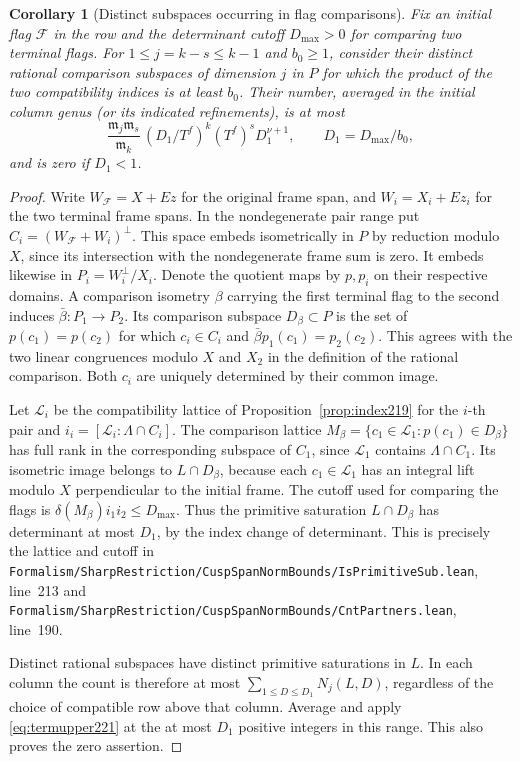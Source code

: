 \documentclass[a4paper,11pt]{article}
\newtheorem{corollary}[proposition]{Corollary}
\theoremstyle{definition}
\theoremstyle{remark}
\newcommand{\srcloc}[2]{{\small\nolinkurl{#1.lean}}, line~#2}
\numberwithin{equation}{section}
\begin{document}
\begin{corollary}[Distinct subspaces occurring in flag comparisons]
\label{cor:subspaces221}
Fix an initial flag \(\mathcal F\) in the row and the
determinant cutoff \(D_{\max}>0\) for comparing two terminal
flags. For \(1\le j=k-s\le k-1\) and \(b_0\ge1\), consider
their distinct rational comparison subspaces of dimension
\(j\) in \(P\) for which the product of the two compatibility
indices is at least \(b_0\). Their number, averaged in the
initial column genus (or its indicated refinements), is at
most
\[
    \frac{\mathfrak m_j\mathfrak m_s}{\mathfrak m_k}\,
       (D_1/T^f)^k (T^f)^s D_1^{\nu+1},
          \qquad D_1=D_{\max}/b_0 ,
\]
and is zero if \(D_1<1\).
\end{corollary}
\begin{proof}
Write \(W_{\mathcal F}=X+Ez\) for the original frame span,
and \(W_i=X_i+Ez_i\) for the two terminal frame spans.
In the nondegenerate pair range put
\(C_i=(W_{\mathcal F}+W_i)^\perp\). This space embeds
isometrically in \(P\) by reduction modulo \(X\), since
its intersection with the nondegenerate frame sum is zero.
It embeds likewise in \(P_i=W_i^\perp/X_i\). Denote the
quotient maps by \(p,p_i\) on their respective domains.
A comparison isometry \(\beta\) carrying the first terminal
flag to the second induces \(\bar\beta:P_1\to P_2\). Its
comparison subspace \(D_\beta\subset P\) is the set of
\(p(c_1)=p(c_2)\) for which \(c_i\in C_i\) and
\(\bar\beta p_1(c_1)=p_2(c_2)\). This agrees with the two
linear congruences modulo \(X\) and \(X_2\) in the
definition of the rational comparison. Both \(c_i\) are
uniquely determined by their common image.

Let \(\mathcal L_i\) be the compatibility lattice of
Proposition~\ref{prop:index219} for the \(i\)-th pair and
\(i_i=[\mathcal L_i:\Lambda\cap C_i]\).
The comparison lattice
\(M_\beta=\{c_1\in\mathcal L_1:p(c_1)\in D_\beta\}\)
has full rank in the corresponding subspace of \(C_1\),
since \(\mathcal L_1\) contains \(\Lambda\cap C_1\).
Its isometric image belongs to \(L\cap D_\beta\), because
each \(c_1\in\mathcal L_1\) has an integral lift modulo
\(X\) perpendicular to the initial frame. The cutoff used
for comparing the flags is
\(\delta(M_\beta)i_1i_2\le D_{\max}\). Thus the primitive
saturation \(L\cap D_\beta\) has determinant at most \(D_1\),
by the index change of determinant. This is precisely the
lattice and cutoff in
\srcloc{Formalism/SharpRestriction/CuspSpanNormBounds/IsPrimitiveSub}{213}
and \srcloc{Formalism/SharpRestriction/CuspSpanNormBounds/CntPartners}{190}.

Distinct rational subspaces have distinct primitive
saturations in \(L\). In each column the count is therefore
at most \(\sum_{1\le D\le D_1}N_j(L,D)\), regardless of the
choice of compatible row above that column. Average and apply
\eqref{eq:termupper221} at the at most \(D_1\) positive
integers in this range. This also proves the zero assertion.
\end{proof}
\end{document}
